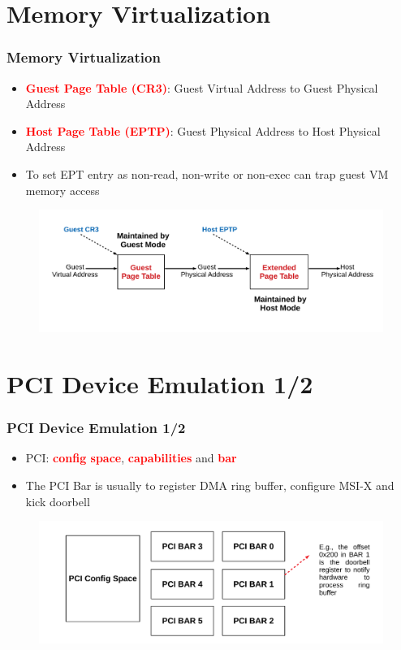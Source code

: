 \documentclass[aspectratio=169]{beamer}
\begin{document}
\section{Memory Virtualization}
\begin{frame}
\frametitle{Memory Virtualization}
\begin{itemize}
\item \textbf{\textcolor{red}{Guest Page Table (CR3)}}: Guest Virtual Address to Guest Physical Address
\item \textbf{\textcolor{red}{Host Page Table (EPTP)}}: Guest Physical Address to Host Physical Address 
\item To set EPT entry as non-read, non-write or non-exec can trap guest VM memory access
\end{itemize}
\begin{figure}
\includegraphics[width=1.0\linewidth]{figures/memory.pdf}
\end{figure}
\end{frame}


\section{PCI Device Emulation 1/2}
\begin{frame}
\frametitle{PCI Device Emulation 1/2}
\begin{itemize}
\item PCI: \textbf{\textcolor{red}{config space}}, \textbf{\textcolor{red}{capabilities}} and \textbf{\textcolor{red}{bar}}
\item The PCI Bar is usually to register DMA ring buffer, configure MSI-X and kick doorbell
\end{itemize}
\begin{figure}
\includegraphics[width=1.0\linewidth]{figures/pci_spec.pdf}
\end{figure}
\end{frame}
\end{document}
